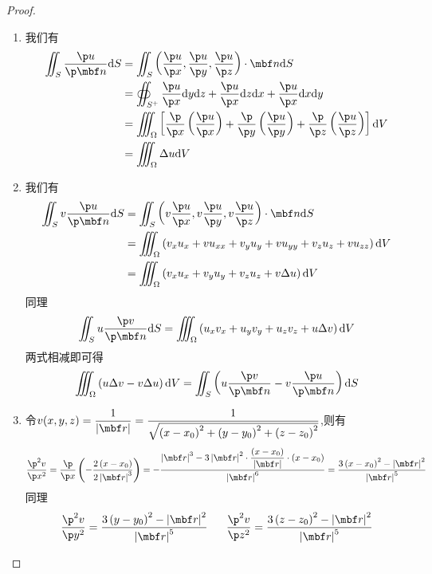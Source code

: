 \documentclass{ctexart}
\begin{document}
\begin{proof}
    \begin{enumerate}[label=\tbf{(\arabic*)}]
        \item 我们有
            \[\begin{aligned}
                \iint_S\dfrac{\p u}{\p\mbf n}\di S
                &= \iint_S\left(\dfrac{\p u}{\p x},\dfrac{\p u}{\p y},\dfrac{\p u}{\p z}\right)\cdot\mbf n\di S \\
                &= \oiint_{S^+}\dfrac{\p u}{\p x}\di y\di z+\dfrac{\p u}{\p x}\di z\di x+\dfrac{\p u}{\p x}\di x\di y \\
                &= \iiint_{\Omega}\left[\dfrac{\p}{\p x}\left(\dfrac{\p u}{\p x}\right)+\dfrac{\p}{\p y}\left(\dfrac{\p u}{\p y}\right)+\dfrac{\p}{\p z}\left(\dfrac{\p u}{\p z}\right)\right]\di V \\
                &= \iiint_{\Omega}\Delta u\di V
            \end{aligned}\]
        \item 我们有
            \[\begin{aligned}
                \iint_Sv\dfrac{\p u}{\p\mbf n}\di S
                &= \iint_S\left(v\dfrac{\p u}{\p x},v\dfrac{\p u}{\p y},v\dfrac{\p u}{\p z}\right)\cdot\mbf n\di S \\
                &= \iiint_\Omega\left(v_xu_x+vu_{xx}+v_yu_y+vu_{yy}+v_zu_z+vu_{zz}\right)\di V \\
                &= \iiint_{\Omega}\left(v_xu_x+v_yu_y+v_zu_z+v\Delta u\right)\di V
            \end{aligned}\]
            同理
            \[\iint_Su\dfrac{\p v}{\p\mbf n}\di S=\iiint_{\Omega}\left(u_xv_x+u_yv_y+u_zv_z+u\Delta v\right)\di V\]
            两式相减即可得
            \[\iiint_\Omega\left(u\Delta v-v\Delta u\right)\di V=\iint_S\left(u\dfrac{\p v}{\p\mbf n}-v\dfrac{\p u}{\p\mbf n}\right)\di S\]
        \item 令$v(x,y,z)=\dfrac{1}{\left|\mbf r\right|}=\dfrac{1}{\sqrt{\left(x-x_0\right)^2+\left(y-y_0\right)^2+\left(z-z_0\right)^2}}$,则有
            \[\dfrac{\p^2 v}{\p x^2}=\dfrac{\p}{\p x}\left(-\dfrac{2\left(x-x_0\right)}{2\left|\mbf r\right|^3}\right)
            =-\dfrac{\left|\mbf r\right|^3-3\left|\mbf r\right|^2\cdot\dfrac{\left(x-x_0\right)}{\left|\mbf r\right|}\cdot\left(x-x_0\right)}{\left|\mbf r\right|^6}
            =\dfrac{3\left(x-x_0\right)^2-\left|\mbf r\right|^2}{\left|\mbf r\right|^5}\]
            同理
            \[\dfrac{\p^2 v}{\p y^2}=\dfrac{3\left(y-y_0\right)^2-\left|\mbf r\right|^2}{\left|\mbf r\right|^5}\ \ \ \ \ \dfrac{\p^2 v}{\p z^2}=\dfrac{3\left(z-z_0\right)^2-\left|\mbf r\right|^2}{\left|\mbf r\right|^5}\]

\end{enumerate}
\end{proof}
\end{document}
